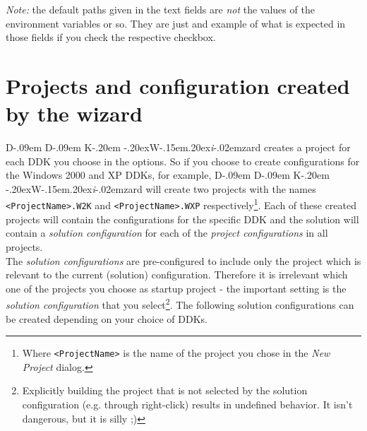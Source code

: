 \documentclass[a4paper,titlepage]{report}
\def\ddkwiz{D\kern-.09em D\kern-.09em K\kern-.20em \raise-.20ex\hbox{W}\kern-.15em\raise.20ex\hbox{\it{i}}\kern-.02em{zard}}
\begin{document}
\emph{Note:} the default paths given in the text fields are \emph{not} the
values of the environment variables or so. They are just and example of what
is expected in those fields if you check the respective checkbox.

\section{Projects and configuration created by the wizard}
\ddkwiz{} creates a project for each DDK you choose in the options. So if
you choose to create configurations for the Windows 2000 and XP DDKs, for example,
\ddkwiz{} will create two projects with the names \texttt{<ProjectName>.W2K} and
\texttt{<ProjectName>.WXP} respectively\footnote{Where \texttt{<ProjectName>} is
the name of the project you chose in the \emph{New Project} dialog.}.
Each of these created projects will contain the configurations for the specific
DDK and the solution will contain a \emph{solution configuration} for each of the
\emph{project configurations} in all projects.\\

The \emph{solution configurations} are pre-configured to include only the
project which is relevant to the current (solution) configuration. Therefore it is
irrelevant which one of the projects you choose as startup project - the
important setting is the \emph{solution configuration} that you
select\footnote{Explicitly building the project that is not selected by the
solution configuration (e.g. through right-click) results in undefined
behavior. It isn't dangerous, but it is silly \textsf{;)}}. The following
solution configurations can be created depending on your choice of DDKs.
\end{document}
